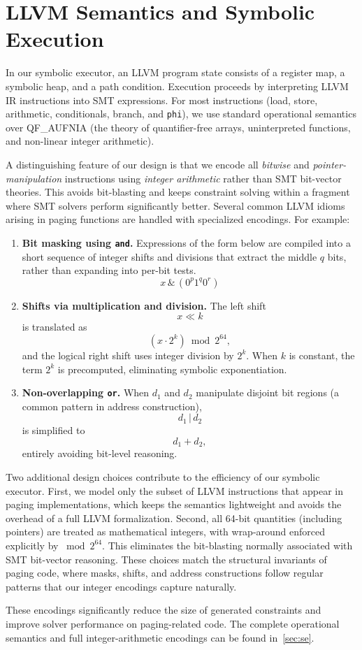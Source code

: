\section{LLVM Semantics and Symbolic Execution}
\label{sec:semantics}

In our symbolic executor, an LLVM program state consists of a register map, a symbolic heap, and a path condition. Execution proceeds by interpreting LLVM IR instructions into SMT expressions. For most instructions (load, store, arithmetic, conditionals, branch, and \texttt{phi}), we use standard operational semantics over QF\_AUFNIA (the theory of quantifier-free arrays, uninterpreted functions, and non-linear integer arithmetic).


A distinguishing feature of our design is that we encode all \emph{bitwise} and \emph{pointer-manipulation} instructions using \emph{integer arithmetic} rather than SMT bit-vector theories. This avoids bit-blasting and keeps constraint solving within a fragment where SMT solvers perform significantly better. Several common LLVM idioms arising in paging functions are handled with specialized encodings. For example:

\begin{enumerate}
  \item \textbf{Bit masking using \texttt{and}.}  
  Expressions of the form below are compiled into a short sequence of integer shifts and divisions that extract the middle $q$ bits, rather than expanding into per-bit tests.
  \[
      x \,\&\, (0^p 1^q 0^r)
  \]

  \item \textbf{Shifts via multiplication and division.}  
  The left shift 
  \[
      x \ll k
  \]
  is translated as 
  \[
      (x \cdot 2^{k}) \bmod 2^{64},
  \]
  and the logical right shift uses integer division by $2^k$.  
  When $k$ is constant, the term $2^k$ is precomputed, eliminating symbolic exponentiation.

  \item \textbf{Non-overlapping \texttt{or}.}  
  When $d_1$ and $d_2$ manipulate disjoint bit regions (a common pattern in address construction),
  \[
      d_1 \,|\, d_2
  \]
  is simplified to
  \[
      d_1 + d_2,
  \]
  entirely avoiding bit-level reasoning.
\end{enumerate}

Two additional design choices contribute to the efficiency of our symbolic executor.
First, we model only the subset of LLVM instructions that appear in paging implementations, which keeps the semantics lightweight and avoids the overhead of a full LLVM formalization. Second, all 64-bit quantities (including pointers) are treated as mathematical integers, with wrap-around enforced explicitly by $\bmod 2^{64}$. 
This eliminates the bit-blasting normally associated with SMT bit-vector reasoning.
These choices match the structural invariants of paging code, where masks, shifts, and address constructions follow regular patterns that our integer encodings capture naturally.

These encodings significantly reduce the size of generated constraints and improve solver performance on paging-related code.
The complete operational semantics and full integer-arithmetic encodings can be found in~\autoref{sec:se}.

